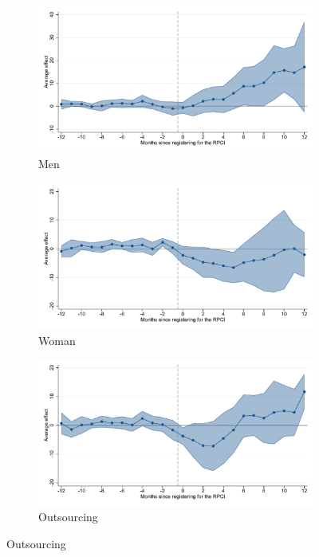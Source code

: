 \begin{figure}[H]
    \centering
    \caption{Event studies - RPCI effect on formal wage}
    
    \begin{subfigure}{0.32\textwidth}
    \caption{Men}
    \includegraphics[width=\textwidth]{04_Figures/muestra_10porciento/event_study_sal_formal_hombre_dcdh_connected.pdf}
    \end{subfigure}
    \begin{subfigure}{0.32\textwidth}
    \caption{Woman}
    \includegraphics[width=\textwidth]{04_Figures/muestra_10porciento/event_study_sal_formal_mujer_dcdh_connected.pdf}
    \end{subfigure}
    \begin{subfigure}{0.32\textwidth}
    \caption{Outsourcing}
    \includegraphics[width=\textwidth]{04_Figures/muestra_10porciento/event_study_sal_formal_base_outsourcing_dcdh_connected.pdf}
    \end{subfigure}
    

\end{figure}
